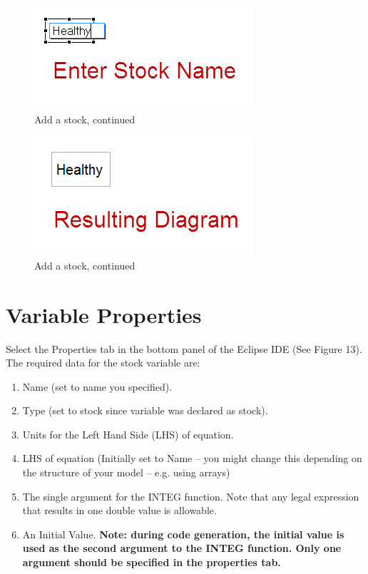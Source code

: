 \documentclass[11pt]{amsart}
\begin{document}
\begin{figure}[ht]
\begin{center}
\vspace{.2in}
\centerline {
\includegraphics[totalheight=0.15\textheight]{images/011.jpg}
}
\caption{Add a stock, continued}
\label{fig:011}
\end{center}
\end{figure}




\begin{figure}[ht]
\begin{center}
\vspace{.2in}
\centerline {
\includegraphics[totalheight=0.15\textheight]{images/012.jpg}
}
\caption{Add a stock, continued}
\label{fig:012}
\end{center}
\end{figure}

\clearpage

\section{Variable Properties}
Select the Properties tab in the bottom panel of the Eclipse IDE (See Figure 13). The required data for the stock variable are:

\begin{enumerate}
\item Name (set to name you specified).
\item Type (set to stock since variable was declared as stock).
\item Units for the Left Hand Side (LHS) of equation.
\item LHS of equation (Initially set to Name – you might change this depending on the structure of your model – e.g. using arrays)
\item The single argument for the INTEG function. Note that any legal expression that results in one double value is allowable.
\item An Initial Value. \textbf{Note: during code generation, the initial value is used as the second argument to the INTEG function. Only one argument should be specified in the properties tab.}
\end{enumerate}
\vspace{.2in}
\end{document}
